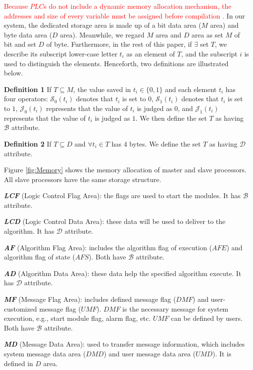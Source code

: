 \documentclass[journal,UTF8]{IEEEtran}
\begin{document}
	\textcolor{red}{Because $PLC$s do not include a dynamic memory allocation mechanism, the addresses and size of every variable must be assigned before compilation \cite{prahofer2017static}.} In our system, the dedicated storage area is made up of a bit data area ($M$ area) and byte data area ($D$ area). Meanwhile, we regard $M$ area and $D$ area as set $M$ of bit and set $D$ of byte. Furthermore, in the rest of this paper, if $\exists$ set $T$, we describe its subscript lower-case letter $t_i$ as an element of $T$, and the subscript $i$ is used to distinguish the elements. Henceforth, two definitions are illustrated below.
	
	\textbf{Definition 1} If $ T \subseteq M$, the value saved in $t_{i} \in \{0, 1\} $ and each element $t_i$ has four operators: $\mathcal{S}_0(t_i)$ denotes that $t_i$ is set to $0$, $\mathcal{S}_1(t_i)$ denotes that $t_i$ is set to $1$, $\mathcal{J}_0(t_i)$ represents that the value of $t_i$ is judged as $0$, and $\mathcal{J}_1(t_i)$ represents that the value of $t_i$ is judged as $1$. We then define the set $T$ as having $\mathcal{B}$ attribute.
	
	\textbf{Definition 2} If $ T \subseteq D$ and $\forall t_{i} \in T$ has 4 bytes. We define the set $T$ as having $\mathcal{D}$ attribute.
	
	
	Figure \ref{fig:Memory} shows the memory allocation of master and slave processors. All slave processors have the same storage structure.
	
	\textbf{\emph{LCF}} (Logic Control Flag Area): the flags are used to start the modules. It has $\mathcal{B}$ attribute.
	
	\textbf{\emph{LCD}} (Logic Control Data Area): these data will be used to deliver to the algorithm. It has $\mathcal{D}$ attribute.
	
	\textbf{\emph{AF}} (Algorithm Flag Area): includes the algorithm flag of execution ($AFE$) and algorithm flag of state ($AFS$). Both have $\mathcal{B}$ attribute.
	
	\textbf{\emph{AD}} (Algorithm Data Area): these data help the specified algorithm execute. It has $\mathcal{D}$ attribute.
	
	\textbf{\emph{MF}} (Message Flag Area): includes defined message flag ($DMF$) and user-customized message flag ($UMF$). $DMF$ is the necessary message for system execution, e.g., start module flag, alarm flag, etc. $UMF$ can be defined by users. Both have $\mathcal{B}$ attribute.
	
	\textbf{\emph{MD}} (Message Data Area): used to transfer message information, which includes system message data area ($DMD$) and user message data area ($UMD$). It is defined in $D$ area.
	
\end{document}
